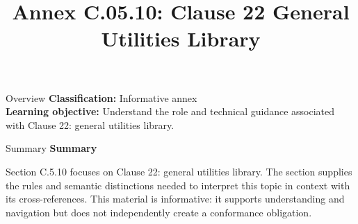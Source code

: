 \documentclass[10pt,letterpaper]{article}
\title{Annex C.05.10: Clause 22 General Utilities Library}
\author{}
\date{}
\begin{document}
\maketitle
\begin{CornellOverviewBox}{Overview}
\textbf{Classification:} Informative annex\\[2pt]
\textbf{Learning objective:} Understand the role and technical guidance associated with Clause 22: general utilities library.
\end{CornellOverviewBox}\begin{CornellSummaryBox}{Summary}
{\sffamily\bfseries\color{Accent} Summary}\par\vspace{3pt}Section C.5.10 focuses on Clause 22: general utilities library. The section supplies the rules and semantic distinctions needed to interpret this topic in context with its cross-references. This material is informative: it supports understanding and navigation but does not independently create a conformance obligation.
\end{CornellSummaryBox}
\end{document}
